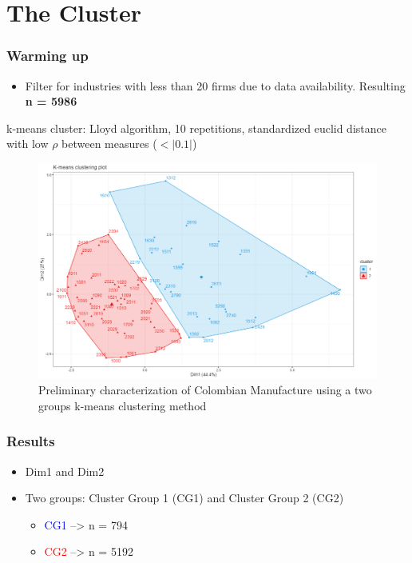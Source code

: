 \documentclass{beamer}
\begin{document}
\section{The Cluster}
	\begin{frame}
		\frametitle{Warming up}
		\begin{itemize}
			\item Filter for industries with less than 20 firms due to data availability. Resulting \textbf{n = 5986}
		\end{itemize}
	k-means cluster: Lloyd algorithm, 10 repetitions, standardized euclid distance with low $\rho$ between measures ($<|0.1|$)
	\end{frame}
	\begin{frame}
		\begin{figure}[H]	
			\caption{Preliminary characterization of Colombian Manufacture using a two groups k-means clustering method}
			\centering
			\includegraphics[scale = 0.29]{cluster.png}
		\end{figure}
	\end{frame} 
	\begin{frame}
	\frametitle{Results}
	\begin{itemize}
		\item Dim1 and Dim2
		\item Two groups: Cluster Group 1 (CG1) and Cluster Group 2 (CG2)
		\begin{itemize}
			\item \textcolor{blue}{CG1} --> n = 794
			\item \textcolor{red}{CG2}  --> n = 5192
		\end{itemize}
	\end{itemize}
	\end{frame}
\end{document}
